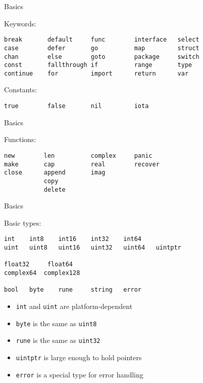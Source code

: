\documentclass[10pt]{beamer}
\begin{document}
	
	\begin{frame}[t,fragile]{Basics}
		\begin{center}
			Keywords:
		\end{center}
		\begin{verbatim}
break       default     func        interface   select
case        defer       go          map         struct
chan        else        goto        package     switch
const       fallthrough if          range       type
continue    for         import      return      var
		\end{verbatim}
		\vspace*{-4ex}
		\begin{center}
			Constants:
		\end{center}
		\begin{verbatim}
true        false       nil         iota
		\end{verbatim}
\end{frame}


	\begin{frame}[t,fragile]{Basics}
		\begin{center}
			Functions:
		\end{center}
		\begin{verbatim}
new        len          complex     panic
make       cap          real        recover
close      append       imag
           copy 
           delete
		\end{verbatim}
\end{frame}


	\begin{frame}[t,fragile]{Basics}
		\begin{center}
			Basic types:
		\end{center}
		\begin{verbatim}
int    int8    int16    int32    int64
uint   uint8   uint16   uint32   uint64   uintptr

float32     float64
complex64  complex128

bool   byte    rune     string   error
		\end{verbatim}
		\vspace*{-4ex}
		\begin{itemize}
			\item \texttt{int} and \texttt{uint} are platform-dependent
			\item \texttt{byte} is the same as \texttt{uint8}
			\item \texttt{rune} is the same as \texttt{uint32}
			\item \texttt{uintptr} is large enough to hold pointers
			\item \texttt{error} is a special type for error handling
		\end{itemize}
\end{frame}
	
\end{document}
